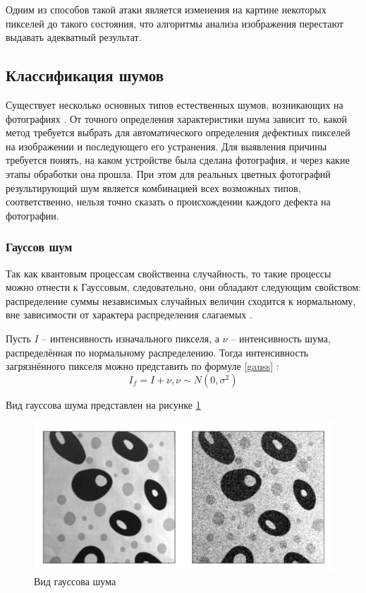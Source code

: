 Одним из способов такой атаки является изменения на картине некоторых пикселей до такого состояния, что алгоритмы анализа изображения перестают выдавать адекватный результат.


\subsection{Классификация шумов}
Существует несколько основных типов естественных шумов, возникающих на фотографиях \cite{filterTechincs}.
От точного определения характеристики шума зависит то, какой метод требуется выбрать для автоматического определения дефектных пикселей на изображении и последующего его устранения.
Для выявления причины требуется понять, на каком устройстве была сделана фотография, и через какие этапы обработки она прошла.
При этом для реальных цветных фотографий результирующий шум является комбинацией всех возможных типов, соответственно, нельзя точно сказать о происхождении каждого дефекта на фотографии.

\subsubsection{Гауссов шум}
Так как квантовым процессам свойственна случайность, то такие процессы можно отнести к Гауссовым, следовательно, они обладают следующим свойством: распределение суммы независимых случайных величин сходится к нормальному, вне зависимости от характера распределения слагаемых \cite{inproceedings}.

Пусть $I$ -- интенсивность изначального пикселя, а $\nu$ -- интенсивность шума, распределённая по нормальному распределению. 
Тогда интенсивность загрязнённого пикселя можно представить по формуле \ref{gauss} \cite{filterTechincs}: 
\begin{equation}
	\label{gauss}
I_f = I + \nu,  \nu \sim N(0, \sigma^2)
\end{equation}


Вид гауссова шума представлен на рисунке \ref{fig::gaussSh}
\FloatBarrier
\begin{figure}[h]	
	\begin{center}
		\includegraphics[width=\linewidth]{inc/png/gaussShum.png}
	\end{center}
	\captionsetup{justification=centering}
	\caption{Вид гауссова шума}
	\label{fig::gaussSh}
\end{figure}
\FloatBarrier

